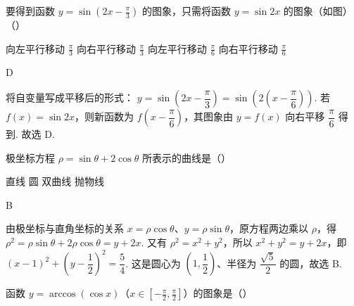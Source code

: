 \documentclass[UTF8,a4paper,oneside,11pt]{ctexbook}
\begin{document}
\begin{problem}

要得到函数 \(y = \sin \left(2x - \frac{\pi}{3}\right)\) 的图象，只需将函数 \(y = \sin 2x\) 的图象（如图）（\quad）

\choices
    {向左平行移动 \(\frac{\pi}{3}\)}
    {向右平行移动 \(\frac{\pi}{3}\)}
    {向左平行移动 \(\frac{\pi}{6}\)}
    {向右平行移动 \(\frac{\pi}{6}\)}
\end{problem}

\begin{answer}
D
\end{answer}

\begin{solution}
将自变量写成平移后的形式：
\(y=\sin\left(2x-\dfrac{\pi}{3}\right)=\sin\left(2\left(x-\dfrac{\pi}{6}\right)\right)\). 若 \(f(x)=\sin2x\)，则新函数为 \(f\left(x-\dfrac{\pi}{6}\right)\)，其图象由 \(y=f(x)\) 向右平移 \(\dfrac{\pi}{6}\) 得到. 故选 D.
\end{solution}

\begin{problem}

极坐标方程 \(\rho = \sin \theta + 2\cos \theta\) 所表示的曲线是（\quad）

\choices
    {直线}
    {圆}
    {双曲线}
    {抛物线}
\end{problem}

\begin{answer}
B
\end{answer}

\begin{solution}
由极坐标与直角坐标的关系 \(x=\rho\cos\theta\)、\(y=\rho\sin\theta\)，原方程两边乘以 \(\rho\)，得
\(\rho^2=\rho\sin\theta+2\rho\cos\theta=y+2x\). 又有 \(\rho^2=x^2+y^2\)，所以
\(x^2+y^2=y+2x\)，即
\(\left(x-1\right)^2+\left(y-\dfrac12\right)^2=\dfrac54\).
这是圆心为 \(\left(1,\dfrac12\right)\)、半径为 \(\dfrac{\sqrt5}{2}\) 的圆，故选 B.
\end{solution}

\begin{problem}

函数 \(y = \arccos(\cos x)\)（\(x \in \left[-\frac{\pi}{2}, \frac{\pi}{2}\right]\)）的图象是（\quad）

\choices
    {}
    {}
    {}
    {}
\end{problem}
\end{document}
